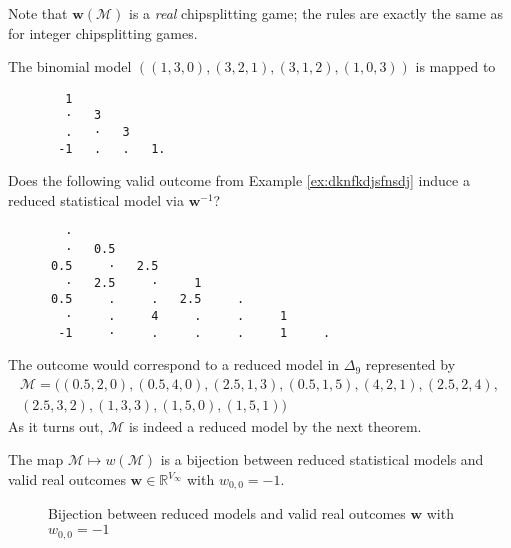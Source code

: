 Note that \( \mathbf w(\mathcal{M}) \) is a \emph{real} chipsplitting game; the rules are exactly the same as for integer chipsplitting games.

\begin{example}\label{ex:binomial-model-chip-three}
    The binomial model \( ((1,3,0), (3,2,1), (3,1,2), (1,0,3)) \) is mapped to
    \begin{verbatim}
        1
        ·   3  
        .   ·   3
       -1   .   .   1.
    \end{verbatim}
\end{example}

\begin{example}\label{ex:alpaca-andy}
    Does the following valid outcome from Example \ref{ex:dknfkdjsfnsdj} induce a reduced statistical model via \( \mathbf w^{-1} \)?
    \begin{verbatim}
        · 
        ·   0.5 
      0.5     ·   2.5 
        ·   2.5     ·     1 
      0.5     .     .   2.5     . 
        ·     .     4     .     .     1 
       -1     ·     .     .     .     1     . 
    \end{verbatim} 
    The outcome would correspond to a reduced model in \( \Delta_9 \) represented by
    \begin{gather*}
        \mathcal{M} = ((0.5, 2, 0), (0.5, 4, 0), (2.5, 1,3), (0.5, 1, 5), (4, 2,1), (2.5, 2, 4),\\ (2.5, 3,2), (1, 3,3), (1, 5,0), (1,5,1))
    \end{gather*}
    As it turns out, \( \mathcal{M} \) is indeed a reduced model by the next theorem.
\end{example}

\begin{theorem}\label{thm:outcome-reduced-model}
    The map \( \mathcal{M} \mapsto w(\mathcal{M}) \) is a bijection between reduced statistical models and valid real outcomes \( \mathbf w \in \mathbb{R}^{V_\infty} \) with \( w_{0,0} = -1 \).
\end{theorem}

\begin{figure}[H]
    \centering
    \caption{Bijection between reduced models and valid real outcomes \( \mathbf w \) with \( w_{0,0} = -1 \)}
\end{figure}


